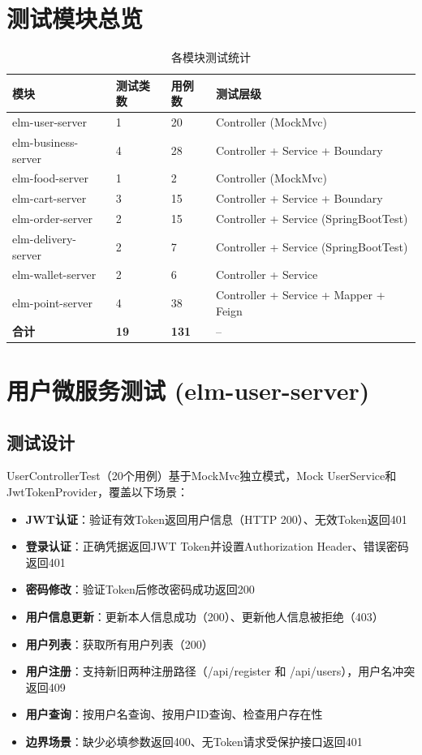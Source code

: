 \section{测试模块总览}

\begin{table}[H]
	\centering
	\caption{各模块测试统计}
	\begin{tabular}{p{5.5cm}p{1.8cm}p{2.8cm}p{4.0cm}}
		\hline
		\textbf{模块} & \textbf{测试类数} & \textbf{用例数} & \textbf{测试层级} \\
		\hline
		elm-user-server & 1 & 20 & Controller (MockMvc) \\
		elm-business-server & 4 & 28 & Controller + Service + Boundary \\
		elm-food-server & 1 & 2 & Controller (MockMvc) \\
		elm-cart-server & 3 & 15 & Controller + Service + Boundary \\
		elm-order-server & 2 & 15 & Controller + Service (SpringBootTest) \\
		elm-delivery-server & 2 & 7 & Controller + Service (SpringBootTest) \\
		elm-wallet-server & 2 & 6 & Controller + Service \\
		elm-point-server & 4 & 38 & Controller + Service + Mapper + Feign \\
		\hline
		\textbf{合计} & \textbf{19} & \textbf{131} & -- \\
		\hline
	\end{tabular}
\end{table}

\section{用户微服务测试 (elm-user-server)}

\subsection{测试设计}

UserControllerTest（20个用例）基于MockMvc独立模式，Mock UserService和JwtTokenProvider，覆盖以下场景：

\begin{itemize}
	\item \textbf{JWT认证}：验证有效Token返回用户信息（HTTP 200）、无效Token返回401
	\item \textbf{登录认证}：正确凭据返回JWT Token并设置Authorization Header、错误密码返回401
	\item \textbf{密码修改}：验证Token后修改密码成功返回200
	\item \textbf{用户信息更新}：更新本人信息成功（200）、更新他人信息被拒绝（403）
	\item \textbf{用户列表}：获取所有用户列表（200）
	\item \textbf{用户注册}：支持新旧两种注册路径（/api/register 和 /api/users），用户名冲突返回409
	\item \textbf{用户查询}：按用户名查询、按用户ID查询、检查用户存在性
	\item \textbf{边界场景}：缺少必填参数返回400、无Token请求受保护接口返回401
\end{itemize}


